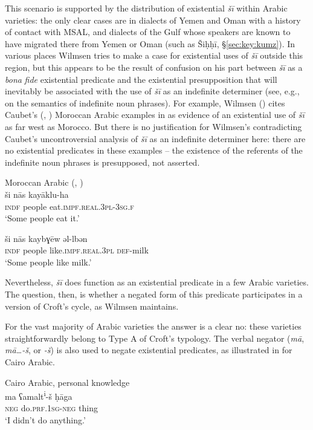 \documentclass[output=paper]{langsci/langscibook}
\begin{document}
This scenario is supported by the distribution of existential \textit{šī} within Arabic varieties: the only clear cases are in dialects of Yemen and Oman with a history of contact with MSAL, and dialects of the Gulf whose speakers are known to have migrated there from Yemen or Oman (such as Šiḥḥī, §\ref{sec:key:kumz}). In various places Wilmsen tries to make a case for existential uses of \textit{šī} outside this region, but this appears to be the result of confusion on his part between \textit{šī} as a \textit{bona} \textit{fide} existential predicate and the existential presupposition that will inevitably be associated with the use of \textit{šī} as an indefinite determiner (see, e.g., \citealt{Heim1988} on the semantics of indefinite noun phrases). For example, Wilmsen (\citeyear[123]{Wilmsen2014}) cites Caubet’s (\citeyear[123]{Caubet1993a}, \citeyear[280]{Caubet1993b}) Moroccan Arabic examples in  as evidence of an existential use of \textit{šī} as far west as Morocco. But there is no justification for Wilmsen’s contradicting Caubet’s uncontroversial analysis of \textit{šī} as an indefinite determiner here: there are no existential predicates in these examples – the existence of the referents of the indefinite noun phrases is presupposed, not asserted.

\ea\label{ex:key:mor}
{Moroccan Arabic (\citealt[123]{Caubet1993a}, \citealt[280]{Caubet1993b})}\\
\ea\gll ši nās kayāklu-ha\\
     \textsc{indf} people eat.\textsc{impf.real.3pl-3sg.f}  \\
\glt ‘Some people eat it.’

\ex
\gll ši nās kaybɣēw əl-lbən\\
     \textsc{indf} people like.\textsc{impf.real.3pl} \textsc{def-}milk\\
\glt  ‘Some people like milk.’
\z
\z

Nevertheless, \textit{šī} does function as an existential predicate in a few Arabic varieties. The question, then, is whether a negated form of this predicate participates in a version of Croft’s cycle, as Wilmsen maintains.

For the vast majority of Arabic varieties the answer is a clear no: these varieties straightforwardly belong to Type A of Croft’s typology. The verbal negator (\textit{mā}, \textit{mā…-š}, or \textit{{}-š}) is also used to negate existential predicates, as illustrated in  for Cairo Arabic. 

\ea\label{ex:key:cair}
{Cairo Arabic, personal knowledge} \\
\ea\gll ma ʕamalt\textsuperscript{i}{}-š ḥāga\\
     \textsc{neg} do.\textsc{prf.1sg-neg} thing  \\
\glt ‘I didn’t do anything.’
\end{document}
